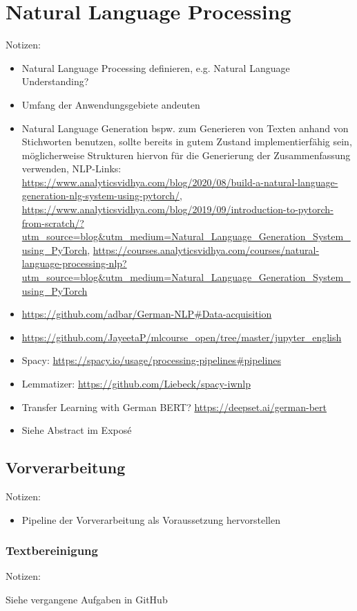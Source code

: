 \chapter{Natural Language Processing}
\thispagestyle{fancy}
\label{chap:Natural Language Processing}

Notizen:
\begin{itemize}
	\item Natural Language Processing definieren, e.g. Natural Language Understanding?
	\item Umfang der Anwendungsgebiete andeuten
	\item Natural Language Generation bspw. zum Generieren von Texten anhand von Stichworten benutzen, sollte bereits in gutem Zustand implementierfähig sein, möglicherweise Strukturen hiervon für die Generierung der Zusammenfassung verwenden, NLP-Links: \url{https://www.analyticsvidhya.com/blog/2020/08/build-a-natural-language-generation-nlg-system-using-pytorch/}, \url{https://www.analyticsvidhya.com/blog/2019/09/introduction-to-pytorch-from-scratch/?utm_source=blog&utm_medium=Natural_Language_Generation_System_using_PyTorch}, \url{https://courses.analyticsvidhya.com/courses/natural-language-processing-nlp?utm_source=blog&utm_medium=Natural_Language_Generation_System_using_PyTorch}
	\item \url{https://github.com/adbar/German-NLP#Data-acquisition}
	\item \url{https://github.com/JayeetaP/mlcourse_open/tree/master/jupyter_english}
	\item Spacy: \url{https://spacy.io/usage/processing-pipelines#pipelines}
	\item Lemmatizer: \url{https://github.com/Liebeck/spacy-iwnlp}
	\item Transfer Learning with German BERT? \url{https://deepset.ai/german-bert}
	\item Siehe Abstract im Exposé
\end{itemize}


\section{Vorverarbeitung}
Notizen:
\begin{itemize}
	\item Pipeline der Vorverarbeitung als Voraussetzung hervorstellen
\end{itemize}


\subsection{Textbereinigung}
Notizen:
	\item Siehe vergangene Aufgaben in GitHub


